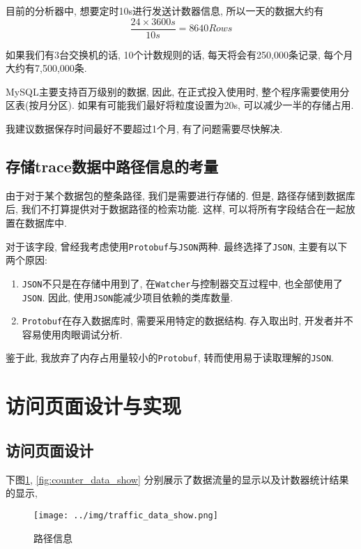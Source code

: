 目前的分析器中, 想要定时10s进行发送计数器信息, 所以一天的数据大约有
$$\frac{24 \times 3600 s}{10s} = 8640 Rows $$

如果我们有3台交换机的话, 10个计数规则的话, 每天将会有250,000条记录,
每个月大约有7,500,000条.

MySQL主要支持百万级别的数据, 因此, 在正式投入使用时,
整个程序需要使用分区表(按月分区).
如果有可能我们最好将粒度设置为20s, 可以减少一半的存储占用.

我建议数据保存时间最好不要超过1个月, 有了问题需要尽快解决.


\subsection{存储trace数据中路径信息的考量}

由于对于某个数据包的整条路径, 我们是需要进行存储的. 但是,
路径存储到数据库后, 我们不打算提供对于数据路径的检索功能. 这样,
可以将所有字段结合在一起放置在数据库中.

对于该字段, 曾经我考虑使用\texttt{Protobuf}与\texttt{JSON}两种.
最终选择了\texttt{JSON}, 主要有以下两个原因:

\begin{enumerate}
\def\labelenumi{\arabic{enumi}.}
\item
  \texttt{JSON}不只是在存储中用到了,
  在\texttt{Watcher}与控制器交互过程中, 也全部使用了\texttt{JSON}. 因此,
  使用\texttt{JSON}能减少项目依赖的类库数量.
\item
  \texttt{Protobuf}在存入数据库时, 需要采用特定的数据结构. 存入取出时,
  开发者并不容易使用肉眼调试分析.
\end{enumerate}

鉴于此, 我放弃了内存占用量较小的\texttt{Protobuf},
转而使用易于读取理解的\texttt{JSON}.


\section{访问页面设计与实现}

\subsection{访问页面设计}

下图\ref{fig:traffic_data_show}, \ref{fig:counter_data_show}
分别展示了数据流量的显示以及计数器统计结果的显示,

\begin{figure}[htbp!]
  \centering
  \texttt{[image: ../img/traffic\_data\_show.png]}
  \caption{路径信息}
  \label{fig:traffic_data_show}
\end{figure}


